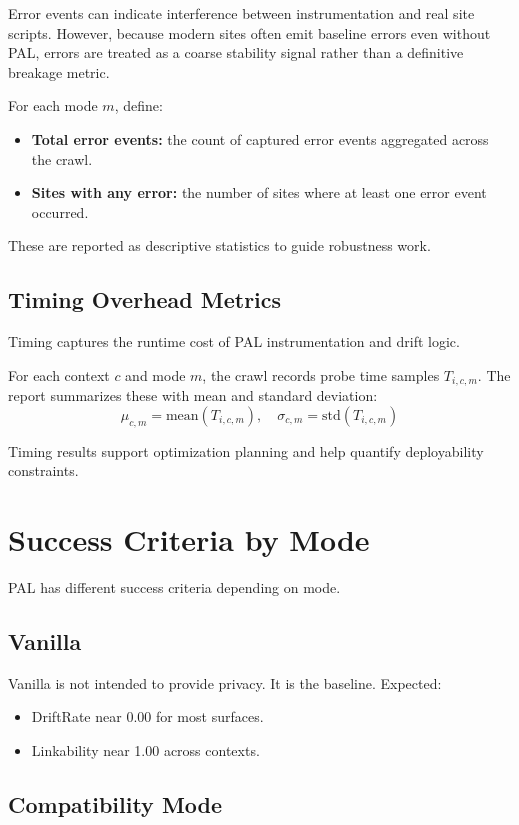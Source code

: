 \documentclass[11pt]{report}
\begin{document}
Error events can indicate interference between instrumentation and real site scripts. However, because modern sites often emit baseline errors even without PAL, errors are treated as a coarse stability signal rather than a definitive breakage metric.

For each mode $m$, define:
\begin{itemize}
    \item \textbf{Total error events:} the count of captured error events aggregated across the crawl.
    \item \textbf{Sites with any error:} the number of sites where at least one error event occurred.
\end{itemize}

These are reported as descriptive statistics to guide robustness work.

\subsection{Timing Overhead Metrics}

Timing captures the runtime cost of PAL instrumentation and drift logic.

For each context $c$ and mode $m$, the crawl records probe time samples $T_{i,c,m}$.
The report summarizes these with mean and standard deviation:
\[
\mu_{c,m} = \text{mean}(T_{i,c,m}), \quad \sigma_{c,m} = \text{std}(T_{i,c,m})
\]

Timing results support optimization planning and help quantify deployability constraints.

\section{Success Criteria by Mode}

PAL has different success criteria depending on mode.

\subsection{Vanilla}

Vanilla is not intended to provide privacy. It is the baseline.
Expected:
\begin{itemize}
    \item DriftRate near 0.00 for most surfaces.
    \item Linkability near 1.00 across contexts.
\end{itemize}

\subsection{Compatibility Mode}
\end{document}
